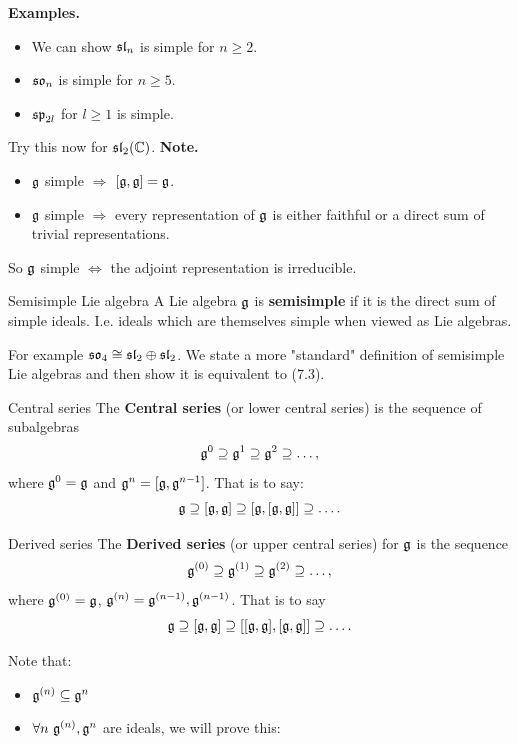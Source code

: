 \documentclass{article}
\begin{document}
\textbf{Examples. } \hspace{0.1cm}
    \begin{itemize}
    \item We can show $\mathfrak{sl}_{n}$ is simple for $n \geq 2$.
    \item $\mathfrak{so}_{n}$ is simple for $n \geq 5$.
    \item $\mathfrak{sp}_{2l}$ for $l \geq 1$ is simple.
    \end{itemize}
    Try this now for $\mathfrak{sl}_{2}(\mathbb{C})$.\gap
\textbf{Note. } \begin{itemize}
    \item $\mathfrak{g}$ simple $\Rightarrow$ $[\mathfrak{g},\mathfrak{g}]=\mathfrak{g}$.
    \item $\mathfrak{g}$ simple $\Rightarrow$ every representation of $\mathfrak{g}$ is either faithful or a direct sum of trivial representations.
\end{itemize}
So $\mathfrak{g}$ simple $\Leftrightarrow$ the adjoint representation is irreducible.
\begin{fancydefine}{Semisimple Lie algebra}
    A Lie algebra $\mathfrak{g}$ is \textbf{semisimple} if it is the direct sum of simple ideals. I.e. ideals which are themselves simple when viewed as Lie algebras.
\end{fancydefine}
For example $\mathfrak{so}_{4} \cong \mathfrak{sl}_{2} \oplus \mathfrak{sl}_{2}$. We state a more "standard" definition of semisimple Lie algebras and then show it is equivalent to (7.3).
\begin{fancydefine}{Central series}
    The \textbf{Central series} (or lower central series) is the sequence of subalgebras \[ \mathfrak{g}^{0} \supseteq \mathfrak{g}^{1} \supseteq \mathfrak{g}^{2} \supseteq \dots, \] where $\mathfrak{g}^{0} = \mathfrak{g}$ and $\mathfrak{g}^{n} = [\mathfrak{g}, \mathfrak{g}^{n-1}]$. That is to say: \[ \mathfrak{g} \supseteq [\mathfrak{g}, \mathfrak{g}] \supseteq [\mathfrak{g}, [\mathfrak{g}, \mathfrak{g}]] \supseteq \dots. \]
\end{fancydefine}
\begin{fancydefine}{Derived series}
    The \textbf{Derived series} (or upper central series) for $\mathfrak{g}$ is the sequence \[ \mathfrak{g}^{(0)} \supseteq \mathfrak{g}^{(1)} \supseteq \mathfrak{g}^{(2)} \supseteq \dots, \] where $\mathfrak{g}^{(0)} = \mathfrak{g}$, $\mathfrak{g}^{(n)} = \mathfrak{g}^{(n-1)}, \mathfrak{g}^{(n-1)}$. That is to say \[ \mathfrak{g} \supseteq [\mathfrak{g}, \mathfrak{g}] \supseteq [[\mathfrak{g}, \mathfrak{g}], [\mathfrak{g}, \mathfrak{g}]] \supseteq \dots. \]
\end{fancydefine}
Note that: \begin{itemize}
    \item $\mathfrak{g}^{(n)} \subseteq \mathfrak{g}^{n}$
    \item $\forall n \, \, \mathfrak{g}^{(n)}, \mathfrak{g}^{n}$ are ideals, we will prove this:
\end{itemize}
\end{document}
